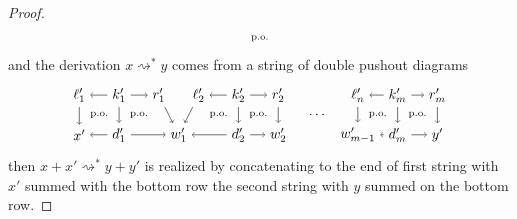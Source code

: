 \documentclass{amsart}
\newcommand{\deriv}[2]{#1 \rightsquigarrow^\ast #2}
\theoremstyle{remark}
\theoremstyle{definition}
\begin{document}
\begin{proof}
\[\begin{tikzpicture}
      \node () at (8.5,0.5) {\scriptsize{p.o.}};
    \end{tikzpicture}
  \]
  and the derivation $ \deriv{x}{y} $ comes from a string of double
  pushout diagrams
  \[
    \begin{tikzpicture}
      \node (1t) at (0,1) {$ \ell'_1 $};
      \node (2t) at (1,1) {$ k'_1 $};
      \node (3t) at (2,1) {$ r'_1 $};
      \node (4t) at (3,1) {$ \ell'_2 $};
      \node (5t) at (4,1) {$ k'_2 $};
      \node (6t) at (5,1) {$ r'_2 $};
      \node (7t) at (7,1) {$ \ell'_n $};
      \node (8t) at (8,1) {$ k'_m $};
      \node (9t) at (9,1) {$ r'_m $};
      \node (1b) at (0,0) {$ x' $};
      \node (2b) at (1,0) {$ d'_1 $};
      \node (3b) at (2.5,0) {$ w'_1 $};
      \node (4b) at (4,0) {$ d'_2 $};
      \node (5b) at (5,0) {$ w'_2 $};
      \node (6b) at (7,0) {$ w'_{m-1} $};
      \node (7b) at (8,0) {$ d'_m $};
      \node (8b) at (9,0) {$ y' $};
      \draw [->] (2t) to node [] {\scriptsize{$  $}} (1t);
      \draw [->] (2t) to node [] {\scriptsize{$  $}} (3t);
      \draw [->] (5t) to node [] {\scriptsize{$  $}} (4t);
      \draw [->] (5t) to node [] {\scriptsize{$  $}} (6t);
      \draw [->] (8t) to node [] {\scriptsize{$  $}} (7t);
      \draw [->] (8t) to node [] {\scriptsize{$  $}} (9t);
      \draw [->] (2b) to node [] {\scriptsize{$  $}} (1b);
      \draw [->] (2b) to node [] {\scriptsize{$  $}} (3b);
      \draw [->] (4b) to node [] {\scriptsize{$  $}} (3b);
      \draw [->] (4b) to node [] {\scriptsize{$  $}} (5b);
      \draw [->] (7b) to node [] {\scriptsize{$  $}} (6b);
      \draw [->] (7b) to node [] {\scriptsize{$  $}} (8b);
      \draw [->] (1t) to node [] {\scriptsize{$  $}} (1b);
      \draw [->] (2t) to node [] {\scriptsize{$  $}} (2b);
      \draw [->] (3t) to node [] {\scriptsize{$  $}} (3b);
      \draw [->] (4t) to node [] {\scriptsize{$  $}} (3b);
      \draw [->] (5t) to node [] {\scriptsize{$  $}} (4b);
      \draw [->] (6t) to node [] {\scriptsize{$  $}} (5b);
      \draw [->] (7t) to node [] {\scriptsize{$  $}} (6b);
      \draw [->] (8t) to node [] {\scriptsize{$  $}} (7b);
      \draw [->] (9t) to node [] {\scriptsize{$  $}} (8b);
      \node () at (6,0.5) {$ \dotsm $};
      \node () at (0.5,0.5) {\scriptsize{p.o.}};
      \node () at (1.5,0.5) {\scriptsize{p.o.}};
      \node () at (3.5,0.5) {\scriptsize{p.o.}};
      \node () at (4.5,0.5) {\scriptsize{p.o.}};
      \node () at (7.5,0.5) {\scriptsize{p.o.}};
      \node () at (8.5,0.5) {\scriptsize{p.o.}};
    \end{tikzpicture}
  \]
  then $ \deriv{x+x'}{y+y'} $ is realized by concatenating to the end
  of first string with $ x' $ summed with the bottom row the second
  string with $ y $ summed on the bottom row.
\end{proof}
\end{document}
